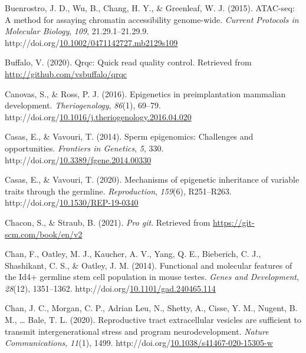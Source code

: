 \documentclass[12pt,twoside]{reedthesis}
\newlength{\cslhangindent}
\newenvironment{CSLReferences}[2] %
 {%
  \setlength{\parindent}{0pt}
  \ifodd #1 \everypar{\setlength{\hangindent}{\cslhangindent}}\ignorespaces\fi
  \ifnum #2 > 0
  \setlength{\parskip}{#2\baselineskip}
  \fi
 }%
 {}
\begin{document}
\begin{CSLReferences}{1}{0}
\leavevmode{}%
Buenrostro, J. D., Wu, B., Chang, H. Y., \& Greenleaf, W. J. (2015). ATAC-seq: A method for assaying chromatin accessibility genome-wide. \emph{Current Protocols in Molecular Biology}, \emph{109}, 21.29.1--21.29.9. http://doi.org/\href{https://doi.org/10.1002/0471142727.mb2129s109}{10.1002/0471142727.mb2129s109}

\leavevmode{}%
Buffalo, V. (2020). Qrqc: Quick read quality control. Retrieved from \url{http://github.com/vsbuffalo/qrqc}

\leavevmode{}%
Canovas, S., \& Ross, P. J. (2016). Epigenetics in preimplantation mammalian development. \emph{Theriogenology}, \emph{86}(1), 69--79. http://doi.org/\href{https://doi.org/10.1016/j.theriogenology.2016.04.020}{10.1016/j.theriogenology.2016.04.020}

\leavevmode{}%
Casas, E., \& Vavouri, T. (2014). Sperm epigenomics: Challenges and opportunities. \emph{Frontiers in Genetics}, \emph{5}, 330. http://doi.org/\href{https://doi.org/10.3389/fgene.2014.00330}{10.3389/fgene.2014.00330}

\leavevmode{}%
Casas, E., \& Vavouri, T. (2020). Mechanisms of epigenetic inheritance of variable traits through the germline. \emph{Reproduction}, \emph{159}(6), R251--R263. http://doi.org/\href{https://doi.org/10.1530/REP-19-0340}{10.1530/REP-19-0340}

\leavevmode{}%
Chacon, S., \& Straub, B. (2021). \emph{Pro git}. Retrieved from \url{https://git-scm.com/book/en/v2}

\leavevmode{}%
Chan, F., Oatley, M. J., Kaucher, A. V., Yang, Q. E., Bieberich, C. J., Shashikant, C. S., \& Oatley, J. M. (2014). Functional and molecular features of the Id4+ germline stem cell population in mouse testes. \emph{Genes and Development}, \emph{28}(12), 1351--1362. http://doi.org/\href{https://doi.org/10.1101/gad.240465.114}{10.1101/gad.240465.114}

\leavevmode{}%
Chan, J. C., Morgan, C. P., Adrian Leu, N., Shetty, A., Cisse, Y. M., Nugent, B. M., \ldots{} Bale, T. L. (2020). Reproductive tract extracellular vesicles are sufficient to transmit intergenerational stress and program neurodevelopment. \emph{Nature Communications}, \emph{11}(1), 1499. http://doi.org/\href{https://doi.org/10.1038/s41467-020-15305-w}{10.1038/s41467-020-15305-w}


\end{CSLReferences}
\end{document}
